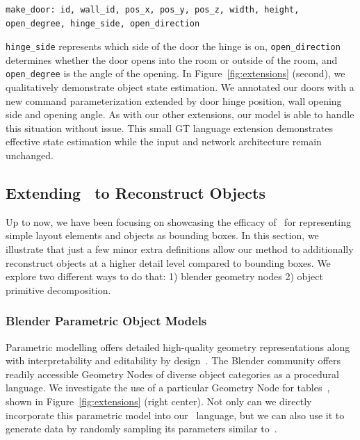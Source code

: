 \begin{lstlisting}[language=StructuredLanguage]
make_door: id, wall_id, pos_x, pos_y, pos_z, width, height, open_degree, hinge_side, open_direction
\end{lstlisting}
\texttt{hinge\_side} represents which side of the door the hinge is on, \texttt{open\_direction} determines whether the door opens into the room or outside of the room, and \texttt{open\_degree} is the angle of the opening.
In Figure~\ref{fig:extensions} (second),
we qualitatively demonstrate object state estimation.
We annotated our doors
with a new command parameterization
extended by door hinge position, wall opening side and opening angle.
As with our other extensions,
our model is able to handle this situation without issue.
This small GT language extension demonstrates effective state estimation
while the input and network architecture remain unchanged.

\subsection{Extending \METHOD~to Reconstruct Objects}

Up to now, we have been focusing on showcasing the efficacy of \METHOD~for representing simple layout elements and objects as bounding boxes. In this section, we illustrate that just a few minor extra definitions allow our method to additionally reconstruct objects at a higher detail level compared to bounding boxes. We explore two different ways to do that: 1) blender geometry nodes 2) object primitive decomposition.

\subsubsection{Blender Parametric Object Models}

Parametric modelling offers detailed high-quality geometry representations along with interpretability and editability by design~\cite{jones2020shapeassembly,jones2021shapemod,jones2022plad,pearl2022geocode}. 
The Blender community offers readily accessible Geometry Nodes of diverse object categories as a procedural language.
We investigate the use of a particular Geometry Node for tables~\cite{mrBash2023Tables},
shown in Figure~\ref{fig:extensions} (right center).
Not only can we directly incorporate this parametric model
into our \METHOD~language,
but we can also use it to generate data
by randomly sampling its parameters
similar to~\cite{pearl2022geocode}. 

